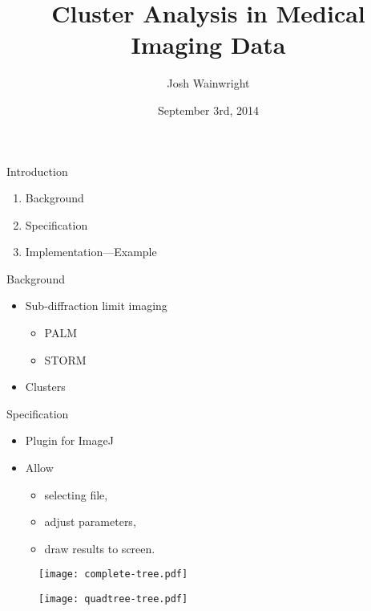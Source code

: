 \documentclass{beamer}
\title{Cluster Analysis in Medical Imaging Data}
\author{Josh Wainwright}
\institute{Supervisor: Iain Styles}
\date{September 3rd, 2014}
\begin{document}
\graphicspath{ {images/} }

\begin{frame}
\titlepage%
\end{frame}

\begin{frame}{Introduction}
	\begin{enumerate}
		\item Background
		\item Specification
		\item Implementation---Example
	\end{enumerate}
\end{frame}

\begin{frame}{Background}
	\begin{itemize}
		\item Sub-diffraction limit imaging
			\begin{itemize}
				\item PALM
				\item STORM
			\end{itemize}
		\item Clusters
	\end{itemize}
\end{frame}

\begin{frame}{Specification}
	\begin{itemize}
		\item Plugin for ImageJ
		\item Allow
			\begin{itemize}
				\item selecting file,
				\item adjust parameters,
				\item draw results to screen.
			\end{itemize}
	\end{itemize}

\end{frame}

\begin{frame}
	\begin{figure}
		\texttt{[image: complete-tree.pdf]}
	\end{figure}
\end{frame}

\begin{frame}
	\begin{figure}
		\texttt{[image: quadtree-tree.pdf]}
	\end{figure}
\end{frame}
\end{document}
